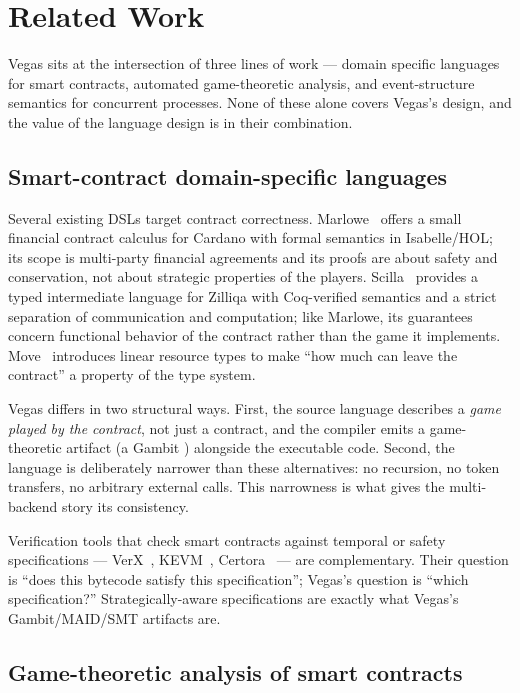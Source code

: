 \section{Related Work}
\label{sec:related}

Vegas sits at the intersection of three lines of work --- domain
specific languages for smart contracts, automated game-theoretic
analysis, and event-structure semantics for concurrent processes.
None of these alone covers Vegas's design, and the value of the
language design is in their combination.

\subsection{Smart-contract domain-specific languages}

Several existing DSLs target contract correctness.
Marlowe~\citep{Lamela2020Marlowe} offers a small financial
contract calculus for Cardano with formal semantics in
Isabelle/HOL; its scope is multi-party financial agreements and
its proofs are about safety and conservation, not about strategic
properties of the players.
Scilla~\citep{Sergey2019Scilla} provides a typed intermediate
language for Zilliqa with Coq-verified semantics and a strict
separation of communication and computation; like Marlowe, its
guarantees concern functional behavior of the contract rather
than the game it implements.
Move~\citep{blackshear2019move} introduces linear resource types
to make ``how much can leave the contract'' a property of the
type system.

Vegas differs in two structural ways.  First, the source
language describes a \emph{game played by the contract},
not just a contract, and the compiler emits a game-theoretic
artifact (a Gambit ) alongside the executable code.
Second, the language is deliberately narrower than these
alternatives: no recursion, no token transfers, no arbitrary
external calls.  This narrowness is what gives the multi-backend
story its consistency.

Verification tools that check smart contracts against temporal
or safety specifications --- VerX~\citep{Permenev2020Verx},
KEVM~\citep{park2018formal}, Certora~\citep{CertoraWhitepaper2022}
--- are complementary.  Their question is ``does this bytecode
satisfy this specification''; Vegas's question is ``which
specification?''  Strategically-aware specifications are exactly
what Vegas's Gambit/MAID/SMT artifacts are.

\subsection{Game-theoretic analysis of smart contracts}

